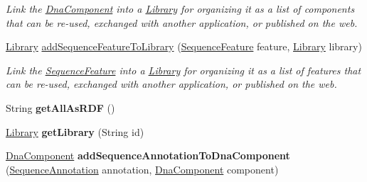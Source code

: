 \begin{DoxyCompactItemize}
\begin{DoxyCompactList}\small\item\em Link the \hyperlink{classorg_1_1sbolstandard_1_1lib_s_b_o_lj_1_1_dna_component}{DnaComponent} into a \hyperlink{classorg_1_1sbolstandard_1_1lib_s_b_o_lj_1_1_library}{Library} for organizing it as a list of components that can be re-\/used, exchanged with another application, or published on the web. \item\end{DoxyCompactList}\item 
\hyperlink{classorg_1_1sbolstandard_1_1lib_s_b_o_lj_1_1_library}{Library} \hyperlink{classorg_1_1sbolstandard_1_1lib_s_b_o_lj_1_1_s_b_o_lservice_ae387ca46de01accf2c313559d3783d1c}{addSequenceFeatureToLibrary} (\hyperlink{classorg_1_1sbolstandard_1_1lib_s_b_o_lj_1_1_sequence_feature}{SequenceFeature} feature, \hyperlink{classorg_1_1sbolstandard_1_1lib_s_b_o_lj_1_1_library}{Library} library)
\begin{DoxyCompactList}\small\item\em Link the \hyperlink{classorg_1_1sbolstandard_1_1lib_s_b_o_lj_1_1_sequence_feature}{SequenceFeature} into a \hyperlink{classorg_1_1sbolstandard_1_1lib_s_b_o_lj_1_1_library}{Library} for organizing it as a list of features that can be re-\/used, exchanged with another application, or published on the web. \item\end{DoxyCompactList}\item 
\hypertarget{classorg_1_1sbolstandard_1_1lib_s_b_o_lj_1_1_s_b_o_lservice_aa526fee3a3bac11771438a28b4fd47ea}{
String {\bfseries getAllAsRDF} ()}
\label{classorg_1_1sbolstandard_1_1lib_s_b_o_lj_1_1_s_b_o_lservice_aa526fee3a3bac11771438a28b4fd47ea}

\item 
\hypertarget{classorg_1_1sbolstandard_1_1lib_s_b_o_lj_1_1_s_b_o_lservice_ae514a61ce2bda5351f853390e77afab5}{
\hyperlink{classorg_1_1sbolstandard_1_1lib_s_b_o_lj_1_1_library}{Library} {\bfseries getLibrary} (String id)}
\label{classorg_1_1sbolstandard_1_1lib_s_b_o_lj_1_1_s_b_o_lservice_ae514a61ce2bda5351f853390e77afab5}

\item 
\hypertarget{classorg_1_1sbolstandard_1_1lib_s_b_o_lj_1_1_s_b_o_lservice_aa99a884c2378cef0b2b4741637a56d00}{
\hyperlink{classorg_1_1sbolstandard_1_1lib_s_b_o_lj_1_1_dna_component}{DnaComponent} {\bfseries addSequenceAnnotationToDnaComponent} (\hyperlink{classorg_1_1sbolstandard_1_1lib_s_b_o_lj_1_1_sequence_annotation}{SequenceAnnotation} annotation, \hyperlink{classorg_1_1sbolstandard_1_1lib_s_b_o_lj_1_1_dna_component}{DnaComponent} component)}
\label{classorg_1_1sbolstandard_1_1lib_s_b_o_lj_1_1_s_b_o_lservice_aa99a884c2378cef0b2b4741637a56d00}


\end{DoxyCompactItemize}
